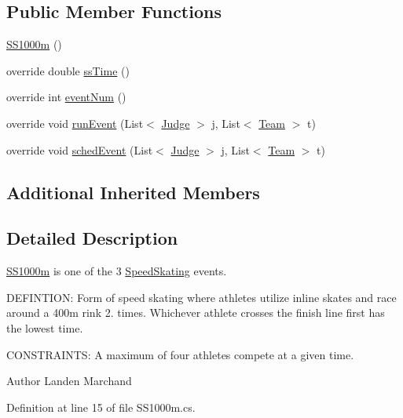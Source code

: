 \subsection*{Public Member Functions}
\begin{DoxyCompactItemize}
\item 
\hyperlink{classPCO_1_1SS1000m_a4e960f497e8a5e1f685966fe258974a3}{S\+S1000m} ()
\item 
override double \hyperlink{classPCO_1_1SS1000m_a20cf8a97d91bb661439b1c251942b68a}{ss\+Time} ()
\item 
override int \hyperlink{classPCO_1_1SS1000m_a7087df2094b075191b778e7b56ea07fd}{event\+Num} ()
\item 
override void \hyperlink{classPCO_1_1SS1000m_a00263d1777d343e9485a0da0e5e7f910}{run\+Event} (List$<$ \hyperlink{classPCO_1_1Judge}{Judge} $>$ j, List$<$ \hyperlink{classPCO_1_1Team}{Team} $>$ t)
\item 
override void \hyperlink{classPCO_1_1SS1000m_a883e286f1896171885422cf5c143c2da}{sched\+Event} (List$<$ \hyperlink{classPCO_1_1Judge}{Judge} $>$ j, List$<$ \hyperlink{classPCO_1_1Team}{Team} $>$ t)
\end{DoxyCompactItemize}
\subsection*{Additional Inherited Members}


\subsection{Detailed Description}
\hyperlink{classPCO_1_1SS1000m}{S\+S1000m} is one of the 3 \hyperlink{classPCO_1_1SpeedSkating}{Speed\+Skating} events. 

D\+E\+F\+I\+N\+T\+I\+O\+N\+: Form of speed skating where athletes utilize inline skates and race around a 400m rink 2. times. Whichever athlete crosses the finish line first has the lowest time.

C\+O\+N\+S\+T\+R\+A\+I\+N\+T\+S\+: A maximum of four athletes compete at a given time.\begin{DoxyAuthor}{Author}
Landen Marchand 
\end{DoxyAuthor}


Definition at line 15 of file S\+S1000m.\+cs.




